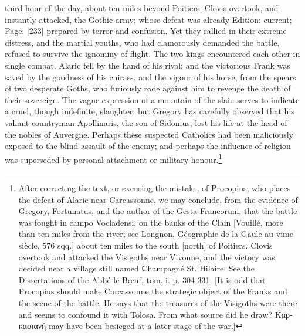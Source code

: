third hour of the day, about ten miles beyond Poitiers, Clovis overtook, and instantly attacked, the Gothic army; whose defeat was already Edition: current; Page: [233] prepared by terror and confusion. Yet they rallied in their extreme distress, and the martial youths, who had clamorously demanded the battle, refused to survive the ignominy of flight. The two kings encountered each other in single combat. Alaric fell by the hand of his rival; and the victorious Frank was saved by the goodness of his cuirass, and the vigour of his horse, from the spears of two desperate Goths, who furiously rode against him to revenge the death of their sovereign. The vague expression of a mountain of the slain serves to indicate a cruel, though indefinite, slaughter; but Gregory has carefully observed that his valiant countryman Apollinaris, the son of Sidonius, lost his life at the head of the nobles of Auvergne. Perhaps these suspected Catholics had been maliciously exposed to the blind assault of the enemy; and perhaps the influence of religion was superseded by personal attachment or military honour.\footnote{After correcting the text, or excusing the mistake, of Procopius, who places the defeat of Alaric near Carcassonne, we may conclude, from the evidence of Gregory, Fortunatus, and the author of the Gesta Francorum, that the battle was fought in campo Vocladensi, on the banks of the Clain [Vouillé, more than ten miles from the river; see Longnon, Géographie de la Gaule au vime siècle, 576 sqq.] about ten miles to the south [north] of Poitiers. Clovis overtook and attacked the Visigoths near Vivonne, and the victory was decided near a village still named Champagné St. Hilaire. See the Dissertations of the Abbé le Bœuf, tom. i. p. 304-331. [It is odd that Procopius should make Carcassonne the strategic object of the Franks and the scene of the battle. He says that the treasures of the Visigoths were there and seems to confound it with Tolosa. From what source did he draw? \textgreek{Καρκασιανή} may have been besieged at a later stage of the war.]}

